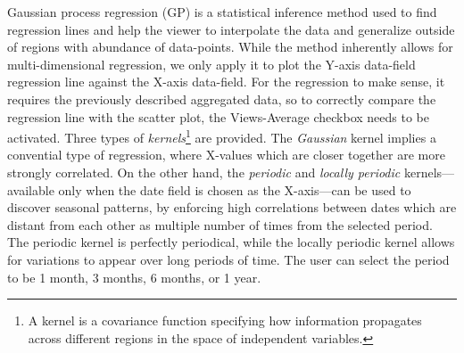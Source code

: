 \documentclass[letterpaper]{article} %
\begin{document}
Gaussian process regression (GP) is a statistical inference method used to find
regression lines and help the viewer to interpolate the data and generalize
outside of regions with abundance of data-points.  While the method inherently
allows for multi-dimensional regression, we only apply it to plot the Y-axis
data-field regression line against the X-axis data-field.  For the regression
to make sense, it requires the previously described aggregated data, so to
correctly compare the regression line with the scatter plot, the Views-Average
checkbox needs to be activated.  Three types of \emph{kernels}\footnote{A
kernel is a covariance function specifying how information propagates across
different regions in the space of independent variables.} are provided.  The
\emph{Gaussian} kernel implies a convential type of regression, where X-values
which are closer together are more strongly correlated.  On the other hand, the
\emph{periodic} and \emph{locally periodic} kernels---available only when the
date field is chosen as the X-axis---can be used to discover seasonal patterns,
by enforcing high correlations between dates which are distant from each other
as multiple number of times from the selected period.  The periodic kernel is
perfectly periodical, while the locally periodic kernel allows for variations
to appear over long periods of time.  The user can select the period to be
1 month, 3 months, 6 months, or 1 year.



\end{document}
